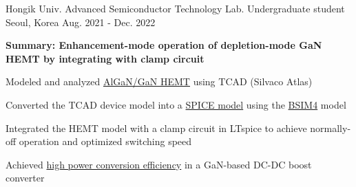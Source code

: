 \begin{cventries}
  \cventry
    {Hongik Univ. Advanced Semiconductor Technology Lab.} %
    {Undergraduate student} %
    {Seoul, Korea} %
    {Aug. 2021 - Dec. 2022} %
    {
      {\textbf{Summary: Enhancement-mode operation of depletion-mode GaN HEMT by integrating with clamp circuit}}
      \vspace{\baselineskip}
      \begin{cvitems} %
        \vspace{0.1 cm}
        \setlength{\itemsep}{0.2 em}
        \item {Modeled and analyzed \underline{AlGaN/GaN HEMT} using TCAD (Silvaco Atlas)}
        \item {Converted the TCAD device model into a \underline{SPICE model} using the \underline{BSIM4} model}
        \item {Integrated the HEMT model with a clamp circuit in LTspice to achieve normally-off operation and optimized switching speed}
        \item {Achieved \underline{high power conversion efficiency} in a GaN-based DC-DC boost converter}
      \end{cvitems}
    }
\end{cventries}
